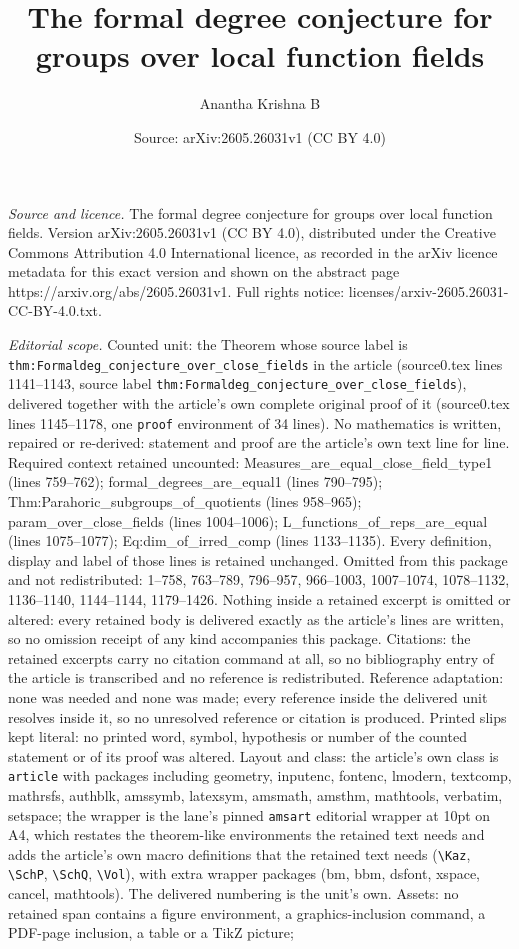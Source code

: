\documentclass[10pt,a4paper]{amsart}
\title[The formal degree conjecture for groups over local function ]{The formal degree conjecture for groups over local function fields}
\author{Anantha Krishna B}
\date{Source: arXiv:2605.26031v1 (CC BY 4.0)}
\begin{document}
\maketitle

\noindent\emph{Source and licence.} The formal degree conjecture for groups over local function fields. Version arXiv:2605.26031v1 (CC BY 4.0), distributed under the Creative Commons Attribution 4.0 International licence, as recorded in the arXiv licence metadata for this exact version and shown on the abstract page https://arxiv.org/abs/2605.26031v1. Full rights notice: licenses/arxiv-2605.26031-CC-BY-4.0.txt.\par\smallskip

\noindent\textit{Editorial scope.} Counted unit: the Theorem whose source label is \texttt{thm:Formaldeg\_conjecture\_over\_close\_fields} in the article (source0.tex lines 1141--1143, source label \texttt{thm:Formaldeg\_conjecture\_over\_close\_fields}), delivered together with the article's own complete original proof of it (source0.tex lines 1145--1178, one \texttt{proof} environment of 34 lines). No mathematics is written, repaired or re-derived: statement and proof are the article's own text line for line. Required context retained uncounted: Measures\_are\_equal\_close\_field\_type1 (lines 759--762); formal\_degrees\_are\_equal1 (lines 790--795); Thm:Parahoric\_subgroups\_of\_quotients (lines 958--965); param\_over\_close\_fields (lines 1004--1006); L\_functions\_of\_reps\_are\_equal (lines 1075--1077); Eq:dim\_of\_irred\_comp (lines 1133--1135). Every definition, display and label of those lines is retained unchanged. Omitted from this package and not redistributed: 1--758, 763--789, 796--957, 966--1003, 1007--1074, 1078--1132, 1136--1140, 1144--1144, 1179--1426. Nothing inside a retained excerpt is omitted or altered: every retained body is delivered exactly as the article's lines are written, so no omission receipt of any kind accompanies this package. Citations: the retained excerpts carry no citation command at all, so no bibliography entry of the article is transcribed and no reference is redistributed. Reference adaptation: none was needed and none was made; every reference inside the delivered unit resolves inside it, so no unresolved reference or citation is produced. Printed slips kept literal: no printed word, symbol, hypothesis or number of the counted statement or of its proof was altered. Layout and class: the article's own class is \texttt{article} with packages including geometry, inputenc, fontenc, lmodern, textcomp, mathrsfs, authblk, amssymb, latexsym, amsmath, amsthm, mathtools, verbatim, setspace; the wrapper is the lane's pinned \texttt{amsart} editorial wrapper at 10pt on A4, which restates the theorem-like environments the retained text needs and adds the article's own macro definitions that the retained text needs (\texttt{\textbackslash Kaz}, \texttt{\textbackslash SchP}, \texttt{\textbackslash SchQ}, \texttt{\textbackslash Vol}), with extra wrapper packages (bm, bbm, dsfont, xspace, cancel, mathtools). The delivered numbering is the unit's own. Assets: no retained span contains a figure environment, a graphics-inclusion command, a PDF-page inclusion, a table or a TikZ picture; 
\end{document}
